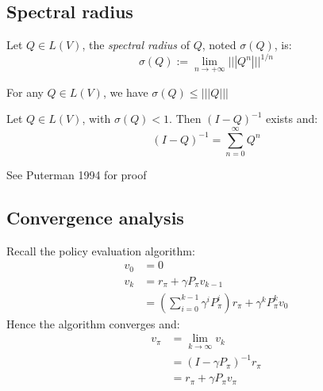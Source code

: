 \documentclass{beamer}
\begin{document}
	\subsection{Spectral radius}
		\begin{frame}
		
			\begin{definition}
				Let $Q \in L(V)$, the \emph{spectral radius} of $Q$, noted $\sigma(Q)$, is:
				\[
					\sigma(Q) := \lim_{n\rightarrow +\infty} |||Q^{n}|||^{1/n}		
				\]
			\end{definition}
			
			For any $Q \in L(V)$, we have $\sigma(Q) \leq ||| Q |||$\\
			
			\begin{theorem}[]
				Let $Q \in L(V)$, with $\sigma(Q)<1$. Then $(I-Q)^{-1}$ exists and:
				\[
					(I-Q)^{-1} = \sum_{n=0}^{\infty} Q^{n}
				\]
			\end{theorem}

			See Puterman 1994 for proof
	    \end{frame}
    
    \subsection{Convergence analysis}
    
	    \begin{frame}
		    Recall the policy evaluation algorithm:
		    \begin{align*}
		    v_{0}&=0\\
		    v_{k} & = r_{\pi} + \gamma P_{\pi} v_{k-1} \\
		    & = \left(\sum_{i=0}^{k-1} \gamma^{i} P_{\pi}^{i}\right) r_{\pi}  + \gamma^{k} P_{\pi}^{k}v_{0}
		    \end{align*}
		    Hence the algorithm converges and:
		    \begin{align*}
			v_{\pi} & = \lim_{k \rightarrow \infty} v_{k}\\
			 &= (I-\gamma P_{\pi})^{-1} r_{\pi} \\
			 &= r_{\pi} + \gamma P_{\pi} v_{\pi}		    
		    \end{align*}
	    \end{frame}
	    
\end{document}
